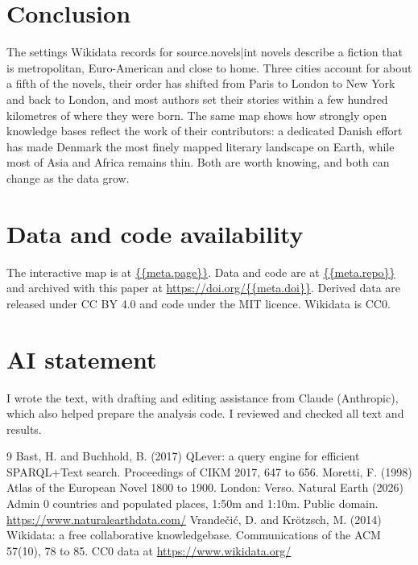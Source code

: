 \documentclass[11pt,a4paper]{article}
\begin{document}
\section{Conclusion}
The settings Wikidata records for {{source.novels|int}} novels describe a fiction that is metropolitan, Euro-American and close to home. Three cities account for about a fifth of the novels, their order has shifted from Paris to London to New York and back to London, and most authors set their stories within a few hundred kilometres of where they were born. The same map shows how strongly open knowledge bases reflect the work of their contributors: a dedicated Danish effort has made Denmark the most finely mapped literary landscape on Earth, while most of Asia and Africa remains thin. Both are worth knowing, and both can change as the data grow.

\section*{Data and code availability}
The interactive map is at \url{{{meta.page}}}. Data and code are at \url{{{meta.repo}}} and archived with this paper at \url{https://doi.org/{{meta.doi}}}. Derived data are released under CC BY 4.0 and code under the MIT licence. Wikidata is CC0.

\section*{AI statement}
I wrote the text, with drafting and editing assistance from Claude (Anthropic), which also helped prepare the analysis code. I reviewed and checked all text and results.

\begin{thebibliography}{9}
 Bast, H. and Buchhold, B. (2017) QLever: a query engine for efficient SPARQL+Text search. Proceedings of CIKM 2017, 647 to 656.
 Moretti, F. (1998) Atlas of the European Novel 1800 to 1900. London: Verso.
 Natural Earth (2026) Admin 0 countries and populated places, 1:50m and 1:10m. Public domain. \url{https://www.naturalearthdata.com/}
 Vrande\v{c}i\'{c}, D. and Kr\"{o}tzsch, M. (2014) Wikidata: a free collaborative knowledgebase. Communications of the ACM 57(10), 78 to 85. CC0 data at \url{https://www.wikidata.org/}
\end{thebibliography}
\end{document}
